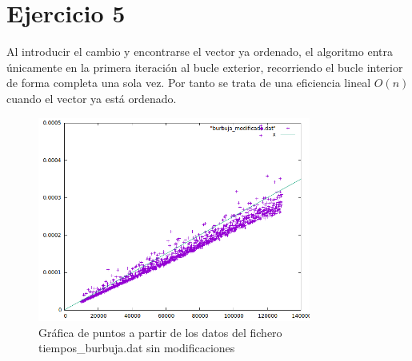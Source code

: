 \documentclass[paper=a4, fontsize=10pt]{scrartcl} %
\begin{document}
\section{Ejercicio 5}

Al introducir el cambio y encontrarse el vector ya ordenado, el algoritmo entra únicamente en la primera iteración al bucle exterior, recorriendo el bucle interior de forma completa una sola vez. Por tanto se trata de una eficiencia lineal $O(n)$ cuando el vector ya está ordenado.

\begin{figure}[H] %
	\centering
	\label{lsblk}
	\includegraphics[width=0.8\textwidth]{../imgs/ejercicio5.PNG}
	\caption{Gráfica de puntos a partir de los datos del fichero tiempos\_burbuja.dat sin modificaciones} 
\end{figure}


\end{document}
